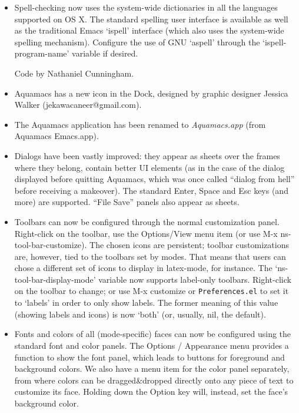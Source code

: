 \begin{itemize}
\item Spell-checking now uses the system-wide dictionaries in all the languages supported on OS X.  The standard spelling user interface is available as well as the traditional Emacs `ispell' interface (which also uses the system-wide spelling mechanism).  Configure the use of GNU `aspell' through the `ispell-program-name' variable if desired. 

Code by Nathaniel Cunningham.

\item Aquamacs has a new icon in the Dock, designed by graphic designer Jessica Walker (jekawacaneer@gmail.com).

\item The Aquamacs application has been renamed to \emph{Aquamacs.app} (from Aquamacs Emacs.app).

\item Dialogs have been vastly improved: they appear as sheets over the frames where they belong, contain better UI elements (as in the case of the dialog displayed before quitting Aquamacs, which was once called ``dialog from hell'' before receiving a makeover).  The standard Enter, Space and Esc keys (and more) are supported.  ``File Save'' panels also appear as sheets. 

\item Toolbars can now be configured through the normal customization panel.  Right-click on the toolbar, use the Options/View menu item (or use M-x ns-tool-bar-customize).  The chosen icons are persistent; toolbar customizations are, however, tied to the toolbars set by modes.  That means that users can chose a different set of icons to display in latex-mode, for instance.  
The `ns-tool-bar-display-mode' variable now supports label-only toolbars.  Right-click on the toolbar to change; or use M-x customize or {\tt Preferences.el} to set it to `labels' in order to only show labels.  The former meaning of this value (showing labels and icons) is now `both' (or, usually, nil, the default).

\item Fonts and colors of all (mode-specific) faces can now be configured using the standard font and color panels.  The Options / Appearance menu provides a function to show the font panel, which leads to buttons for foreground and background colors.   We also have a menu item for the color panel separately, from where colors can be dragged\&dropped directly onto any piece of text to customize its face.  Holding down the Option key will, instead, set the face's background color. 


\end{itemize}

